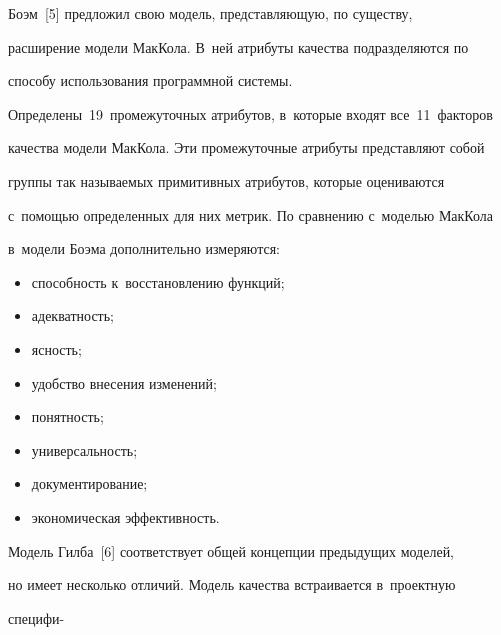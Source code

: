      

     Боэм~[5] предложил свою модель, представляющую, по существу, 

расширение модели МакКола. В~ней атрибуты качества подразделяются по 

способу использования программной сис\-те\-мы. 

Определены~19~промежуточных атрибутов, в~которые входят все~11~факторов 

качества модели МакКола. Эти промежуточные атрибуты представляют собой 

группы так на\-зы\-ва\-емых примитивных атрибутов, которые оцениваются 

с~помощью определенных для них метрик. По сравнению с~моделью МакКола 

в~модели Боэма дополнительно измеряются:

     \begin{itemize}

     \item способность к~восстановлению функций;

     \item адекватность;

     \item ясность;

     \item удобство внесения изменений;

     \item понятность;

     \item универсальность;

\item  документирование;

     \item экономическая эффективность.

     \end{itemize}

     

     Модель Гилба~[6] соответствует общей концепции предыду\-щих моделей, 

но имеет несколько отличий. Модель качества встраивается в~проектную 

специфи-\linebreak\vspace*{-12pt}



\pagebreak



\noindent

